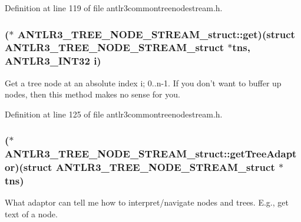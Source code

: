 Definition at line 119 of file antlr3commontreenodestream.\-h.

\hypertarget{struct_a_n_t_l_r3___t_r_e_e___n_o_d_e___s_t_r_e_a_m__struct_af29135ad561a2c7adc155c8c85e3536e}{
\subsubsection[{get}]{($\ast$ A\-N\-T\-L\-R3\-\_\-\-T\-R\-E\-E\-\_\-\-N\-O\-D\-E\-\_\-\-S\-T\-R\-E\-A\-M\-\_\-struct\-::get)(struct {\bf A\-N\-T\-L\-R3\-\_\-\-T\-R\-E\-E\-\_\-\-N\-O\-D\-E\-\_\-\-S\-T\-R\-E\-A\-M\-\_\-struct} $\ast$tns, {\bf A\-N\-T\-L\-R3\-\_\-\-I\-N\-T32} {\bf i})}}\label{struct_a_n_t_l_r3___t_r_e_e___n_o_d_e___s_t_r_e_a_m__struct_af29135ad561a2c7adc155c8c85e3536e}
Get a tree node at an absolute index i; 0..n-\/1. If you don't want to buffer up nodes, then this method makes no sense for you. 

Definition at line 125 of file antlr3commontreenodestream.\-h.

\hypertarget{struct_a_n_t_l_r3___t_r_e_e___n_o_d_e___s_t_r_e_a_m__struct_aa46fce4d8277d8c8ad4fc4a5ecf92116}{
\subsubsection[{get\-Tree\-Adaptor}]{($\ast$ A\-N\-T\-L\-R3\-\_\-\-T\-R\-E\-E\-\_\-\-N\-O\-D\-E\-\_\-\-S\-T\-R\-E\-A\-M\-\_\-struct\-::get\-Tree\-Adaptor)(struct {\bf A\-N\-T\-L\-R3\-\_\-\-T\-R\-E\-E\-\_\-\-N\-O\-D\-E\-\_\-\-S\-T\-R\-E\-A\-M\-\_\-struct} $\ast$tns)}}\label{struct_a_n_t_l_r3___t_r_e_e___n_o_d_e___s_t_r_e_a_m__struct_aa46fce4d8277d8c8ad4fc4a5ecf92116}
What adaptor can tell me how to interpret/navigate nodes and trees. E.\-g., get text of a node. 

